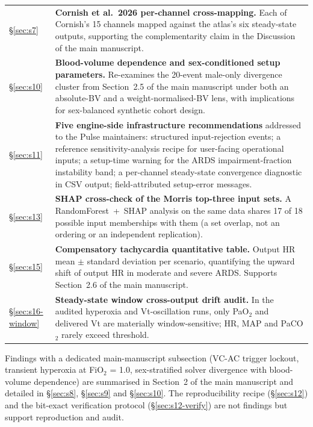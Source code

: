 \documentclass[pdflatex,sn-nature]{sn-jnl}%
\newcommand{\mainref}[2]{#2}
\begin{document}
\begin{table}[htbp]
\begin{tabular}{lp{}}
\S\ref{sec:s7} & \textbf{Cornish et al.\ 2026 per-channel cross-mapping.} Each of Cornish's 15 channels mapped against the atlas's six steady-state outputs, supporting the complementarity claim in the Discussion of the main manuscript. \\
\S\ref{sec:s10} & \textbf{Blood-volume dependence and sex-conditioned setup parameters.} Re-examines the 20-event male-only divergence cluster from Section~\mainref{sec:results-sex}{2.5} of the main manuscript under both an absolute-BV and a weight-normalised-BV lens, with implications for sex-balanced synthetic cohort design. \\
\S\ref{sec:s11} & \textbf{Five engine-side infrastructure recommendations} addressed to the Pulse maintainers: structured input-rejection events; a reference sensitivity-analysis recipe for user-facing operational inputs; a setup-time warning for the ARDS impairment-fraction instability band; a per-channel steady-state convergence diagnostic in CSV output; field-attributed setup-error messages. \\
\S\ref{sec:s13} & \textbf{SHAP cross-check of the Morris top-three input sets.} A RandomForest~+~SHAP analysis on the same data shares 17 of 18 possible input memberships with them (a set overlap, not an ordering or an independent replication). \\
\S\ref{sec:s15} & \textbf{Compensatory tachycardia quantitative table.} Output HR mean $\pm$ standard deviation per scenario, quantifying the upward shift of output HR in moderate and severe ARDS. Supports Section~\mainref{sec:results-secondary}{2.6} of the main manuscript. \\
\S\ref{sec:s16-window} & \textbf{Steady-state window cross-output drift audit.} In the audited hyperoxia and Vt-oscillation runs, only PaO$_2$ and delivered Vt are materially window-sensitive; HR, MAP and PaCO$_2$ rarely exceed threshold. \\
\bottomrule
\end{tabular}
\end{table}

Findings with a dedicated main-manuscript subsection (VC-AC trigger lockout, transient hyperoxia at FiO$_2$ = 1.0, sex-stratified solver divergence with blood-volume dependence) are summarised in Section~\mainref{sec:results}{2} of the main manuscript and detailed in \S\ref{sec:s8}, \S\ref{sec:s9} and \S\ref{sec:s10}. The reproducibility recipe (\S\ref{sec:s12}) and the bit-exact verification protocol (\S\ref{sec:s12-verify}) are not findings but support reproduction and audit.
\end{document}
